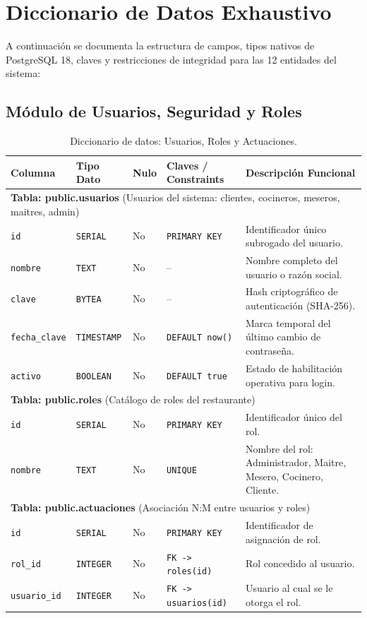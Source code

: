 \documentclass[11pt,letterpaper]{article}
\begin{document}
\newpage
\section{Diccionario de Datos Exhaustivo}

A continuación se documenta la estructura de campos, tipos nativos de PostgreSQL 18, claves y restricciones de integridad para las 12 entidades del sistema:

\subsection{Módulo de Usuarios, Seguridad y Roles}

\begin{table}[h!]
\centering
\scriptsize
\begin{tabularx}{\textwidth}{l l l p{2.5cm} X}
\toprule
\textbf{Columna} & \textbf{Tipo Dato} & \textbf{Nulo} & \textbf{Claves / Constraints} & \textbf{Descripción Funcional} \\
\midrule
\multicolumn{5}{l}{\textbf{Tabla: public.usuarios} (Usuarios del sistema: clientes, cocineros, meseros, maitres, admin)} \\
\texttt{id} & \texttt{SERIAL} & No & \texttt{PRIMARY KEY} & Identificador único subrogado del usuario. \\
\texttt{nombre} & \texttt{TEXT} & No & -- & Nombre completo del usuario o razón social. \\
\texttt{clave} & \texttt{BYTEA} & No & -- & Hash criptográfico de autenticación (SHA-256). \\
\texttt{fecha\_clave} & \texttt{TIMESTAMP} & No & \texttt{DEFAULT now()} & Marca temporal del último cambio de contraseña. \\
\texttt{activo} & \texttt{BOOLEAN} & No & \texttt{DEFAULT true} & Estado de habilitación operativa para login. \\
\midrule
\multicolumn{5}{l}{\textbf{Tabla: public.roles} (Catálogo de roles del restaurante)} \\
\texttt{id} & \texttt{SERIAL} & No & \texttt{PRIMARY KEY} & Identificador único del rol. \\
\texttt{nombre} & \texttt{TEXT} & No & \texttt{UNIQUE} & Nombre del rol: Administrador, Maitre, Mesero, Cocinero, Cliente. \\
\midrule
\multicolumn{5}{l}{\textbf{Tabla: public.actuaciones} (Asociación N:M entre usuarios y roles)} \\
\texttt{id} & \texttt{SERIAL} & No & \texttt{PRIMARY KEY} & Identificador de asignación de rol. \\
\texttt{rol\_id} & \texttt{INTEGER} & No & \texttt{FK -> roles(id)} & Rol concedido al usuario. \\
\texttt{usuario\_id} & \texttt{INTEGER} & No & \texttt{FK -> usuarios(id)} & Usuario al cual se le otorga el rol. \\
\bottomrule
\end{tabularx}
\caption{Diccionario de datos: Usuarios, Roles y Actuaciones.}
\label{tab:dict_usuarios}
\end{table}
\end{document}
